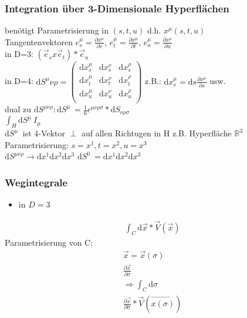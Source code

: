 \documentclass[a4paper]{article}
\begin{document}
\subsubsection{Integration über 3-Dimensionale Hyperflächen}
benötigt Parametrisierung in $(s,t,u)$ d.h. $x^\mu(s,t,u)$\\
Tangentenvektoren $e^\mu_s=\frac{\partial x^\mu}{\partial s}$,
$e^\mu_t=\frac{\partial x^\mu}{\partial t}$, $e^\mu_u=\frac{\partial
x^\mu}{\partial u}$\\
in D=3: $(\vec{e}_s x \vec{e}_t) * \vec{e}_u$\\
in D=4: $\mathrm{d}S^\mu\nu\rho=\begin{pmatrix} 
\mathrm{d}x^\mu_s & \mathrm{d}x^\nu_s & \mathrm{d}x^\rho_s \\
\mathrm{d}x^\mu_t & \mathrm{d}x^\nu_t & \mathrm{d}x^\rho_t \\ 
\mathrm{d}x^\mu_u & \mathrm{d}x^\nu_u & \mathrm{d}x^\rho_u \\\end{pmatrix}
$
z.B.: $\mathrm{d}x^\mu_s=\mathrm{d}s\frac{\partial x^\mu}{\partial s}$ usw.\\
dual zu $\mathrm{d}S^{\mu\nu\rho}: \mathrm{d}S^\mu~=\frac{1}{6}
\epsilon^{\mu\nu\rho\sigma}*\mathrm{d}S_{\nu\rho\sigma}$\\
$\int_H \mathrm{d}S^\mu~ I_\mu$\\
$\mathrm{d}S^\mu~$ ist 4-Vektor
$\perp$ auf allen Richtugen in H
z.B. Hyperfläche $\mathbb{R}^3$
Parametrisierung: $s=x^1,t=x^2,u=x^3$\\
$\mathrm{d}S^{\mu\nu\rho}\rightarrow \mathrm{d}x^1\mathrm{d}x^2\mathrm{d}x^3$
$\mathrm{d}S^{0}~=\mathrm{d}x^1\mathrm{d}x^2\mathrm{d}x^3$


\subsubsection{Wegintegrale}
\begin{itemize}
  \item in $D=3$
\end{itemize}
\begin{align}
\int_C \mathrm{d}\vec{x}*\vec{V}(\vec{x})
\end{align}
Parametrisierung von C:
\begin{align}
\vec{x}=\vec{x}(\sigma)\\
\frac{\partial\vec{x}}{\partial\sigma}\\
\Rightarrow\int_C \mathrm{d}\sigma\\
\frac{\partial\vec{x}}{\partial\sigma}*\vec{V}(\vec{x(\sigma)})
\end{align}
\end{document}
